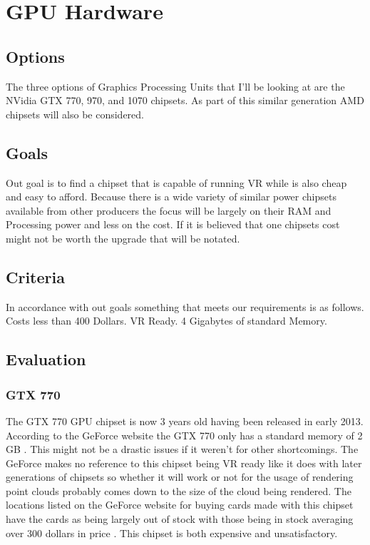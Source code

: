 \documentclass{article}
\begin{document}
\section{GPU Hardware}
\subsection{Options}
The three options of Graphics Processing Units that I'll be looking at are the NVidia GTX 770, 970, and 1070 chipsets. As part of this similar generation AMD chipsets  will also be considered.

\subsection{Goals}
Out goal is to find a chipset that is capable of running VR while is also cheap and easy to afford. Because there is a wide variety of similar power chipsets available from other producers the focus will be largely on their RAM and Processing power and less on the cost. 
If it is believed that one chipsets cost might not be worth the upgrade that will be notated.

\subsection{Criteria}
In accordance with out goals something that meets our requirements is as follows.
Costs less than 400 Dollars.
VR Ready.
4 Gigabytes of standard Memory.

\subsection{Evaluation}
\subsubsection{GTX 770}
The GTX 770 GPU chipset is now 3 years old having been released in early 2013.
According to the GeForce website the GTX 770 only has a standard memory of 2 GB \cite{geforce}.
This might not be a drastic issues if it weren't for other shortcomings.
The GeForce makes no reference to this chipset being VR ready like it does with later generations of chipsets so whether it will work or not for the usage of rendering point clouds probably comes down to the size of the cloud being rendered.
The locations listed on the GeForce website for buying cards made with this chipset have the cards as being largely out of stock with those being in stock averaging over 300 dollars in price \cite{geforce}.
This chipset is both expensive and unsatisfactory.
\end{document}
